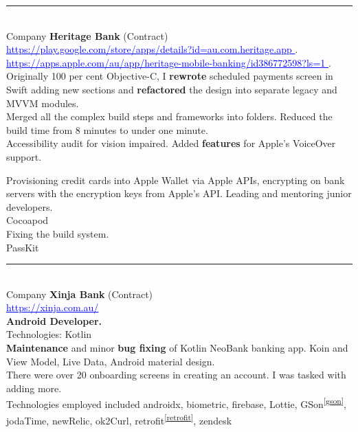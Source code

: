 \documentclass{article}
\begin{document}
\noindent\hfil\rule{0.5\textwidth}{.4pt}\hfil
\\

Company  \textbf {Heritage Bank} (Contract) \\
 \textcolor{blue} { \underline{  https://play.google.com/store/apps/details?id=au.com.heritage.app  }}. \\ 
 \textcolor{blue} { \underline{  https://apps.apple.com/au/app/heritage-mobile-banking/id386772598?ls=1 }}. \\

Originally 100 per cent Objective-C,  I {\bf rewrote} scheduled payments screen in Swift adding new sections and {\bf refactored} the design into separate legacy and MVVM modules.  \\
Merged all the complex build steps and frameworks into folders. Reduced the build time from 8 minutes to under one minute. \\

Accessibility audit for vision impaired. Added {\bf features} for Apple's VoiceOver support.

Provisioning credit cards into Apple Wallet via Apple APIs, encrypting on bank servers with the encryption keys from Apple's API. Leading and mentoring junior developers. \\
Cocoapod \\
Fixing the build system. \\
PassKit \\

\noindent\hfil\rule{0.5\textwidth}{.4pt}\hfil
\\

 Company \textbf {Xinja Bank}  (Contract) \\ 
  \textcolor{blue} { \underline{ https://xinja.com.au/ }}  \\
 \textbf{ Android Developer. }\\
Technologies:  Kotlin \\

{\bf Maintenance} and minor {\bf bug fixing} of Kotlin NeoBank banking app. Koin and View Model, Live Data, Android material design. \\
There were over 20 onboarding screens in creating an account. I was tasked with adding more.  \\

Technologies employed included androidx, biometric, firebase, Lottie, GSon\textsuperscript{\ref{gson}}, jodaTime, newRelic,  ok2Curl, retrofit\textsuperscript{\ref{retrofit}}, zendesk\\
\\
\end{document}
